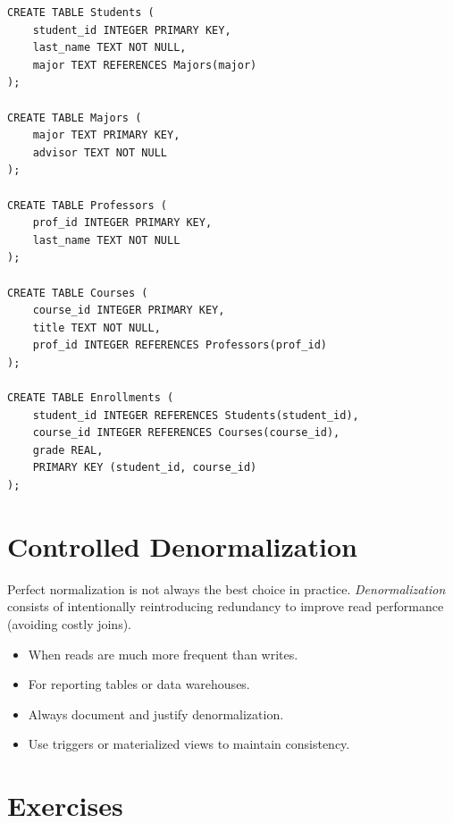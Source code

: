 \begin{codeblock}[title=\textbf{Result After 3NF/BCNF Normalization}]
\begin{verbatim}
CREATE TABLE Students (
    student_id INTEGER PRIMARY KEY,
    last_name TEXT NOT NULL,
    major TEXT REFERENCES Majors(major)
);

CREATE TABLE Majors (
    major TEXT PRIMARY KEY,
    advisor TEXT NOT NULL
);

CREATE TABLE Professors (
    prof_id INTEGER PRIMARY KEY,
    last_name TEXT NOT NULL
);

CREATE TABLE Courses (
    course_id INTEGER PRIMARY KEY,
    title TEXT NOT NULL,
    prof_id INTEGER REFERENCES Professors(prof_id)
);

CREATE TABLE Enrollments (
    student_id INTEGER REFERENCES Students(student_id),
    course_id INTEGER REFERENCES Courses(course_id),
    grade REAL,
    PRIMARY KEY (student_id, course_id)
);
\end{verbatim}
\end{codeblock}

\section{Controlled Denormalization}

\begin{remark}
Perfect normalization is not always the best choice in practice.
\emph{Denormalization} consists of intentionally reintroducing redundancy
to improve read performance (avoiding costly joins).
\end{remark}

\begin{bestpractice}[title=\textbf{When to Denormalize?}]
\begin{itemize}
    \item When reads are much more frequent than writes.
    \item For reporting tables or data warehouses.
    \item Always document and justify denormalization.
    \item Use triggers or materialized views to maintain consistency.
\end{itemize}
\end{bestpractice}

\section*{Exercises}

